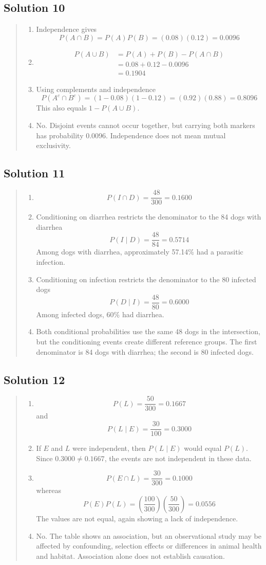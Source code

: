\documentclass[10pt,letterpaper]{article}
\newcommand{\solutionheading}[1]{%
  \subsection*{Solution #1}
}
\newenvironment{answer}{%
  \begin{quote}\small\color{black}
}{%
  \end{quote}
}
\begin{document}
\solutionheading{10}
\begin{answer}
\begin{enumerate}
	\item Independence gives
	$$P(A\cap B)=P(A)P(B)=(0.08)(0.12)=0.0096$$
	\item
	$$
	\begin{aligned}
  	P(A\cup B)
  	&=P(A)+P(B)-P(A\cap B)\\
  	&=0.08+0.12-0.0096\\
  	&=0.1904
  	\end{aligned}
	$$
	\item Using complements and independence
	$$P(A^c\cap B^c)=(1-0.08)(1-0.12)=(0.92)(0.88)=0.8096$$
  	This also equals $1-P(A\cup B)$.
	\item No. Disjoint events cannot occur together, but carrying both markers has probability 0.0096. Independence does not mean mutual exclusivity.
\end{enumerate}
\end{answer}

\solutionheading{11}
\begin{answer}
\begin{enumerate}
	\item
	$$P(I\cap D)=\frac{48}{300}=0.1600$$
  	\item Conditioning on diarrhea restricts the denominator to the 84 dogs with diarrhea
	$$P(I\mid D)=\frac{48}{84}=0.5714$$
	Among dogs with diarrhea, approximately 57.14\% had a parasitic infection.
	\item Conditioning on infection restricts the denominator to the 80 infected dogs
	$$P(D\mid I)=\frac{48}{80}=0.6000$$
  	Among infected dogs, 60\% had diarrhea.
	\item Both conditional probabilities use the same 48 dogs in the intersection, but the conditioning events create different reference groups. The first denominator is 84 dogs with diarrhea; the second is 80 infected dogs.
\end{enumerate}
\end{answer}

\solutionheading{12}
\begin{answer}
\begin{enumerate}
	\item
	$$P(L)=\frac{50}{300}=0.1667 $$
	and
	$$P(L\mid E)=\frac{30}{100}=0.3000$$
	\item If $E$ and $L$ were independent, then $P(L\mid E)$ would equal $P(L)$. Since $0.3000\neq0.1667$, the events are not independent in these data.
	\item
 	$$P(E\cap L)=\frac{30}{300}=0.1000$$
  	whereas
	$$P(E)P(L)=\left(\frac{100}{300}\right)\left(\frac{50}{300}\right)=0.0556$$
  	The values are not equal, again showing a lack of independence.
	\item No. The table shows an association, but an observational study may be affected by confounding, selection effects or differences in animal health and habitat. Association alone does not establish causation.
\end{enumerate}
\end{answer}
\end{document}
